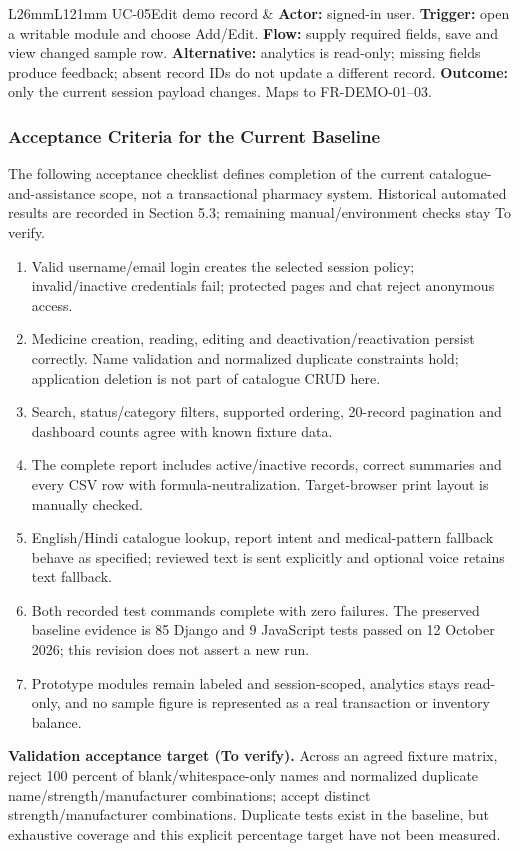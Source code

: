 \documentclass{article}
\begin{document}
\begin{longtable}{L{26mm}L{121mm}}
UC-05\newline Edit demo record & \textbf{Actor:} signed-in user. \textbf{Trigger:} open a writable module and choose Add/Edit. \textbf{Flow:} supply required fields, save and view changed sample row. \textbf{Alternative:} analytics is read-only; missing fields produce feedback; absent record IDs do not update a different record. \textbf{Outcome:} only the current session payload changes. Maps to FR-DEMO-01--03.\\
\end{longtable}

\subsubsection{Acceptance Criteria for the Current Baseline}
The following acceptance checklist defines completion of the current catalogue-and-assistance scope, not a transactional pharmacy system. Historical automated results are recorded in Section 5.3; remaining manual/environment checks stay To verify.
\begin{enumerate}
\item Valid username/email login creates the selected session policy; invalid/inactive credentials fail; protected pages and chat reject anonymous access.
\item Medicine creation, reading, editing and deactivation/reactivation persist correctly. Name validation and normalized duplicate constraints hold; application deletion is not part of catalogue CRUD here.
\item Search, status/category filters, supported ordering, 20-record pagination and dashboard counts agree with known fixture data.
\item The complete report includes active/inactive records, correct summaries and every CSV row with formula-neutralization. Target-browser print layout is manually checked.
\item English/Hindi catalogue lookup, report intent and medical-pattern fallback behave as specified; reviewed text is sent explicitly and optional voice retains text fallback.
\item Both recorded test commands complete with zero failures. The preserved baseline evidence is 85 Django and 9 JavaScript tests passed on 12 October 2026; this revision does not assert a new run.
\item Prototype modules remain labeled and session-scoped, analytics stays read-only, and no sample figure is represented as a real transaction or inventory balance.
\end{enumerate}
\textbf{Validation acceptance target (To verify).} Across an agreed fixture matrix, reject 100 percent of blank/whitespace-only names and normalized duplicate name/strength/manufacturer combinations; accept distinct strength/manufacturer combinations. Duplicate tests exist in the baseline, but exhaustive coverage and this explicit percentage target have not been measured.
\end{document}
